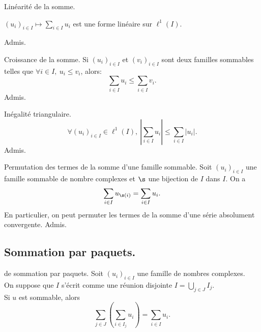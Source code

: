 \documentclass[11pt]{article}
\begin{document}
\begin{thm}{Linéarité de la somme.}{}
    \begin{center}
        $(u_i)_{i\in I}\mapsto \sum\limits_{i\in I}u_i$ est une forme linéaire sur $\ell^1(I)$.
    \end{center}
    \tcblower
    Admis.
\end{thm}

\begin{prop}{Croissance de la somme.}{}
    Si $(u_i)_{i\in I}$ et $(v_i)_{i\in I}$ sont deux familles sommables telles que $\forall i\in I,~u_i\leq v_i$, alors:
    \begin{equation*}
        \sum_{i\in I}u_i\leq\sum_{i\in I}v_i.
    \end{equation*}
    \tcblower
    Admis.
\end{prop}

\begin{corr}{Inégalité triangulaire.}{}
    \begin{equation*}
        \forall (u_i)_{i\in I}\in\ell^1(I),~\left|\sum_{i\in I}u_i\right|\leq\sum_{i\in I}|u_i|.
    \end{equation*}
    \tcblower
    Admis.
\end{corr}

\begin{thm}{Permutation des termes de la somme d'une famille sommable.}{}
    Soit $(u_i)_{i\in I}$ une famille sommable de nombre complexes et $\s$ une bijection de $I$ dans $I$. On a
    \begin{equation*}
        \sum_{i\in I}u_{\s(i)}=\sum_{i\in I}u_i.
    \end{equation*}
    En particulier, on peut permuter les termes de la somme d'une série absolument convergente.
    \tcblower
    Admis.
\end{thm}

\subsection{Sommation par paquets.}

\begin{thm}{de sommation par paquets.}{}
    Soit $(u_i)_{i\in I}$ une famille de nombres complexes.\\
    On suppose que $I$ s'écrit comme une réunion disjointe $I=\bigcup\limits_{j\in J}I_j$.\\
    Si $u$ est sommable, alors
    \begin{equation*}
        \sum_{j\in J}\left( \sum_{i\in I_j}u_i \right) = \sum_{i\in I}u_i.
    \end{equation*}
\end{thm}
\end{document}

